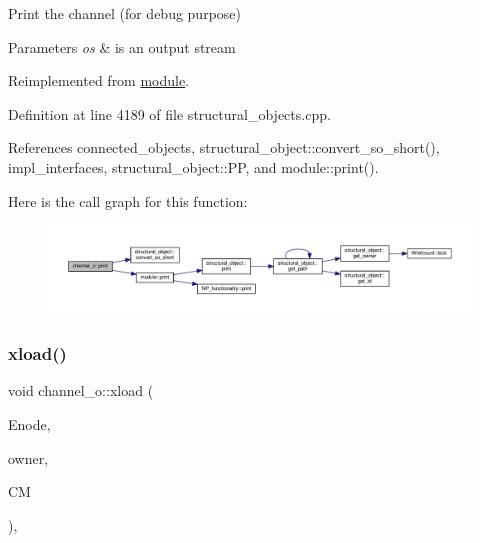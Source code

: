 Print the channel (for debug purpose) 


\begin{DoxyParams}{Parameters}
{\em os} & is an output stream \\
\hline
\end{DoxyParams}


Reimplemented from \hyperlink{classmodule_a91f3995762c61b4bc46bd0520d72dc0a}{module}.



Definition at line 4189 of file structural\+\_\+objects.\+cpp.



References connected\+\_\+objects, structural\+\_\+object\+::convert\+\_\+so\+\_\+short(), impl\+\_\+interfaces, structural\+\_\+object\+::\+PP, and module\+::print().

Here is the call graph for this function\+:
\nopagebreak
\begin{figure}[H]
\begin{center}
\leavevmode
\includegraphics[width=350pt]{d3/d41/classchannel__o_ad3730f48e78b2404ab9acacf200cef73_cgraph}
\end{center}
\end{figure}
\mbox{\label{classchannel__o_aa3a1b88c7d037f8712d927e4e27db8ce}} 
\subsubsection{\texorpdfstring{xload()}{xload()}}
{\footnotesize\ttfamily void channel\+\_\+o\+::xload (\begin{DoxyParamCaption}\item[{const \hyperlink{classxml__element}{xml\+\_\+element} $\ast$}]{Enode,  }\item[{\hyperlink{structural__objects_8hpp_a8ea5f8cc50ab8f4c31e2751074ff60b2}{structural\+\_\+object\+Ref}}]{owner,  }\item[{\hyperlink{structural__manager_8hpp_ab3136f0e785d8535f8d252a7b53db5b5}{structural\+\_\+manager\+Ref} const \&}]{CM }\end{DoxyParamCaption})\hspace{0.3cm}{\ttfamily [override]}, {\ttfamily [virtual]}}



